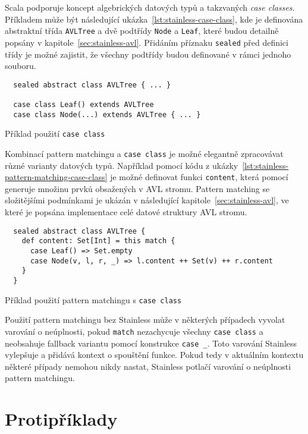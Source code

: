 Scala podporuje koncept algebrických datových typů
a takzvaných \textit{case classes}.
Příkladem může být následující ukázka~\ref{lst:stainless-case-class},
kde je definována abstraktní třída \texttt{AVLTree} a dvě podtřídy \texttt{Node} a \texttt{Leaf},
které budou detailně popsány v kapitole~\ref{sec:stainless-avl}.
Přidáním příznaku \texttt{sealed} před definici třídy
je možné zajistit, že všechny podtřídy budou definované v rámci jednoho souboru.

\begin{listing}[H]
  \begin{verbatim}
  sealed abstract class AVLTree { ... }

  case class Leaf() extends AVLTree
  case class Node(...) extends AVLTree { ... }
  \end{verbatim}
  \caption{Příklad použití \texttt{case class}}
  \label{lst:stainless-case-class}
\end{listing}

Kombinací pattern matchingu a \texttt{case class} je možné elegantně zpracovávat různé varianty datových typů.
Například pomocí kódu z ukázky~\ref{lst:stainless-pattern-matching-case-class}
je možné definovat funkci \texttt{content},
která pomocí generuje množinu prvků obsažených v AVL stromu.
Pattern matching se složitějšími podmínkami je ukázán v následující kapitole~\ref{sec:stainless-avl},
ve které je popsána implementace celé datové struktury AVL stromu.

\begin{listing}[H]
  \begin{verbatim}
  sealed abstract class AVLTree {
    def content: Set[Int] = this match {
      case Leaf() => Set.empty
      case Node(v, l, r, _) => l.content ++ Set(v) ++ r.content
    }
  }
  \end{verbatim}
  \caption{Příklad použití pattern matchingu s \texttt{case class}}
  \label{lst:stainless-pattern-matching-case-class}
\end{listing}

Použití pattern matchingu bez Stainless může v některých případech \mbox{vyvolat}
varování o neúplnosti, pokud \texttt{match} nezachycuje všechny \texttt{case class}
a neobsahuje fallback variantu pomocí konstrukce \texttt{case \_}.
Toto varování Stainless vylepšuje a přidává kontext o spouštění funkce.
Pokud tedy v aktuálním kontextu některé případy nemohou nikdy nastat,
Stainless potlačí varování o neúplnosti pattern matchingu.

\section{Protipříklady}
\label{sec:stainless-counterexamples}

